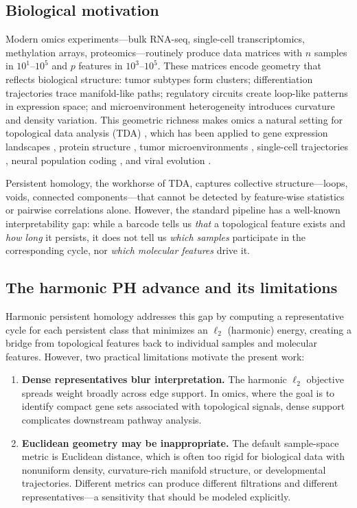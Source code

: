 \documentclass[12pt]{article}
\begin{document}
\subsection{Biological motivation}

Modern omics experiments---bulk RNA-seq, single-cell transcriptomics, methylation arrays, proteomics---routinely produce data matrices with $n$ samples in $10^1$--$10^5$ and $p$ features in $10^3$--$10^5$.
These matrices encode geometry that reflects biological structure:
tumor subtypes form clusters; differentiation trajectories trace manifold-like paths; regulatory circuits create loop-like patterns in expression space; and microenvironment heterogeneity introduces curvature and density variation.
This geometric richness makes omics a natural setting for topological data analysis (TDA) \citep{carlsson2009, edelsbrunner2010}, which has been applied to gene expression landscapes \citep{rizvi2017}, protein structure \citep{xia2014}, tumor microenvironments \citep{vipond2021}, single-cell trajectories \citep{moon2019phate}, neural population coding \citep{giusti2015}, and viral evolution \citep{chan2013topology}.

Persistent homology, the workhorse of TDA, captures collective structure---loops, voids, connected components---that cannot be detected by feature-wise statistics or pairwise correlations alone.
However, the standard pipeline has a well-known interpretability gap: while a barcode tells us \emph{that} a topological feature exists and \emph{how long} it persists, it does not tell us \emph{which samples} participate in the corresponding cycle, nor \emph{which molecular features} drive it.

\subsection{The harmonic PH advance and its limitations}

Harmonic persistent homology \citep{harmonicPH} addresses this gap by computing a representative cycle for each persistent class that minimizes an $\ell_2$ (harmonic) energy, creating a bridge from topological features back to individual samples and molecular features.
However, two practical limitations motivate the present work:
\begin{enumerate}[leftmargin=1.5em]
\item \textbf{Dense representatives blur interpretation.}
The harmonic $\ell_2$ objective spreads weight broadly across edge support.
In omics, where the goal is to identify compact gene sets associated with topological signals, dense support complicates downstream pathway analysis.
\item \textbf{Euclidean geometry may be inappropriate.}
The default sample-space metric is Euclidean distance, which is often too rigid for biological data with nonuniform density, curvature-rich manifold structure, or developmental trajectories.
Different metrics can produce different filtrations and different representatives---a sensitivity that should be modeled explicitly.
\end{enumerate}
\end{document}
